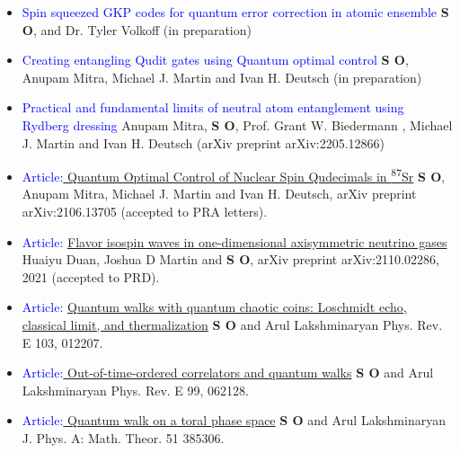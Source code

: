 \documentclass[14pt]{moderncv}
\begin{document}
\begin{minipage}{.95\textwidth}
\begin{itemize}
\item {\textcolor{blue}{ Spin squeezed GKP codes for quantum error correction in atomic ensemble} \textbf{S O}, and Dr. Tyler Volkoff (in preparation)} 

  \item{\textcolor{blue}{Creating entangling Qudit gates using Quantum optimal control}  \textbf{S O}, Anupam Mitra, Michael J. Martin and Ivan H. Deutsch (in preparation)}  
  \item{\textcolor{blue}{Practical and fundamental limits of neutral atom entanglement using Rydberg dressing}  Anupam Mitra, \textbf{S O}, Prof. Grant W. Biedermann , Michael J. Martin and Ivan H. Deutsch (arXiv preprint arXiv:2205.12866)}  
\item \textcolor{blue}{Article:\href{https://arxiv.org/abs/2106.13705}{ Quantum Optimal Control of Nuclear Spin Qudecimals in \textsuperscript{87}Sr}} \textbf{S O}, Anupam Mitra, Michael J. Martin and Ivan H. Deutsch, arXiv preprint arXiv:2106.13705 (accepted to PRA letters).
\item \textcolor{blue}{Article: \href{https://arxiv.org/abs/2110.02286}{Flavor isospin waves in one-dimensional axisymmetric neutrino gases}} Huaiyu Duan, Joshua D Martin and \textbf{S O}, arXiv preprint arXiv:2110.02286, 2021 (accepted to PRD).
\item \textcolor{blue}{Article: \href{https://journals.aps.org/pre/abstract/10.1103/PhysRevE.103.012207}{Quantum walks with quantum chaotic coins: Loschmidt echo, classical limit, and thermalization}} \textbf{S O} and Arul Lakshminaryan Phys. Rev. E 103, 012207.
\item \textcolor{blue}{Article:\href{https://journals.aps.org/pre/abstract/10.1103/PhysRevE.99.062128}{ Out-of-time-ordered correlators and quantum walks}} \textbf{S O} and Arul Lakshminaryan Phys. Rev. E 99, 062128.
\item \textcolor{blue}{Article:\href{https://iopscience.iop.org/article/10.1088/1751-8121/aad50c/meta}{ Quantum walk on a toral phase space}} \textbf{S O}  and Arul Lakshminaryan J. Phys. A: Math. Theor. 51 385306.\\
\end{itemize}
\end{minipage}



\\
\end{document}
